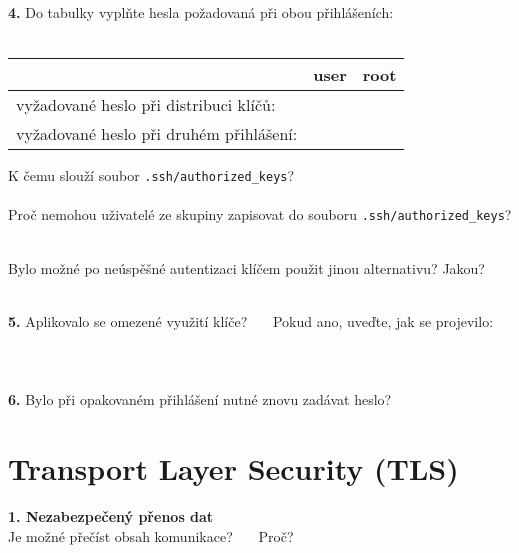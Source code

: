 \documentclass[a4paper,11pt]{article}
\begin{document}
\textbf{4.} Do tabulky vyplňte hesla požadovaná při obou přihlášeních:\\
~\\
\begin{tabular}{|l|c|c|}
\hline
~ & user & root \\
\hline
vyžadované heslo při distribuci klíčů: & \hspace{3cm} & \hspace{3cm} \\
\hline
vyžadované heslo při druhém přihlášení: & \hspace{3cm} & \hspace{3cm} \\
\hline
\end{tabular}

\bigskip
K čemu slouží soubor \texttt{.ssh/authorized\_keys}?
~\\
\underline{\hspace{15cm}} \\
Proč nemohou uživatelé ze skupiny zapisovat do souboru \texttt{.ssh/authorized\_keys}?
~\\
\underline{\hspace{15cm}}

Bylo možné po neúspěšné autentizaci klíčem použit jinou alternativu? Jakou?
~\\
~\\
\underline{\hspace{15cm}}

\textbf{5.} Aplikovalo se omezené využití klíče? \underline{\hspace{1cm}} ~~~Pokud ano, uveďte, jak se projevilo:
~\\
~\\
~\\
\underline{\hspace{16.5cm}}
~\\


\textbf{6.} Bylo při opakovaném přihlášení nutné znovu zadávat heslo? \underline{\hspace{1cm}} \\


\section{Transport Layer Security (TLS)}

\textbf{1. Nezabezpečený přenos dat}\\
Je možné přečíst obsah komunikace? \underline{\hspace{1cm}}~~~Proč?~\underline{\hspace{8cm}}
\end{document}
